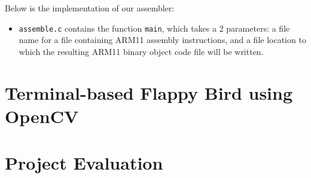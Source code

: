 \documentclass[10pt]{article}
\begin{document}
Below is the implementation of our assembler:

\begin{itemize}
\item \texttt{assemble.c} contains the function \texttt{main}, which takes a 2 parameters:  a file name for a file containing ARM11 assembly instructions, and a file location to which the resulting ARM11 binary object code file will be written.
\end{itemize}

\section{Terminal-based Flappy Bird using OpenCV}

\section{Project Evaluation}
\end{document}
